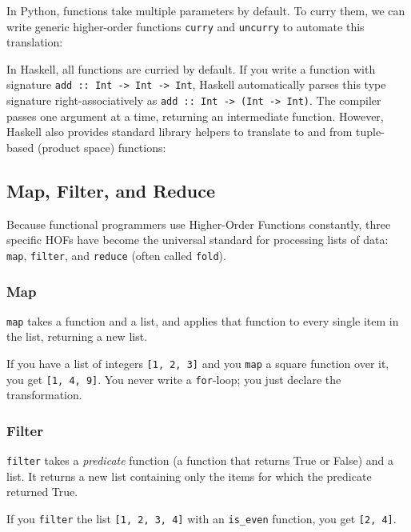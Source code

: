 In Python, functions take multiple parameters by default. To curry them, we can write generic higher-order functions \texttt{curry} and \texttt{uncurry} to automate this translation:



In Haskell, all functions are curried by default. If you write a function with signature \texttt{add :: Int -> Int -> Int}, Haskell automatically parses this type signature right-associatively as \texttt{add :: Int -> (Int -> Int)}. The compiler passes one argument at a time, returning an intermediate function. However, Haskell also provides standard library helpers to translate to and from tuple-based (product space) functions:



\subsection{Map, Filter, and Reduce}

Because functional programmers use Higher-Order Functions constantly, three specific HOFs have become the universal standard for processing lists of data: \texttt{map}, \texttt{filter}, and \texttt{reduce} (often called \texttt{fold}).

\subsubsection{Map}
\texttt{map} takes a function and a list, and applies that function to every single item in the list, returning a new list.

If you have a list of integers \texttt{[1, 2, 3]} and you \texttt{map} a square function over it, you get \texttt{[1, 4, 9]}. You never write a \texttt{for}-loop; you just declare the transformation.

\subsubsection{Filter}
\texttt{filter} takes a \textit{predicate} function (a function that returns True or False) and a list. It returns a new list containing only the items for which the predicate returned True. 

If you \texttt{filter} the list \texttt{[1, 2, 3, 4]} with an \texttt{is\_even} function, you get \texttt{[2, 4]}.

